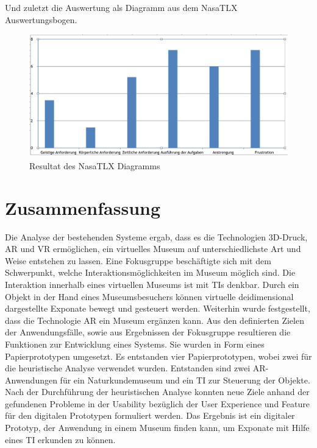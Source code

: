\documentclass[runningheads,a4paper, 12pt]{llncs}
\begin{document}
Und zuletzt die Auswertung als Diagramm aus dem NasaTLX Auswertungsbogen.
\begin{figure}[H]
	\centering
	\includegraphics[angle=0,scale=0.4]{nasatlx_diagram}
	\caption{Resultat des NasaTLX Diagramms}
	\label{fig:result3}
\end{figure}


\section{Zusammenfassung}
Die Analyse der bestehenden Systeme ergab, dass es die Technologien 3D-Druck, AR und VR ermöglichen, ein virtuelles Museum auf unterschiedlichste Art und Weise entstehen zu lassen. Eine Fokusgruppe beschäftigte sich mit dem Schwerpunkt, welche Interaktionsmöglichkeiten im Museum möglich sind. Die Interaktion innerhalb eines virtuellen Museums ist mit TIs denkbar. Durch ein Objekt in der Hand eines Museumsbesuchers können virtuelle deidimensional dargestellte Exponate bewegt und gesteuert werden. Weiterhin wurde festgestellt, dass die Technologie AR ein Museum ergänzen kann. Aus den definierten Zielen der Anwendungsfälle, sowie aus Ergebnissen der Fokusgruppe resultieren die Funktionen zur Entwicklung eines Systems. Sie wurden in Form eines Papierprototypen umgesetzt. Es entstanden vier Papierprototypen, wobei zwei für die heuristische Analyse verwendet wurden. Entstanden sind zwei AR-Anwendungen für ein Naturkundemuseum und ein TI zur Steuerung der Objekte. Nach der Durchführung der heuristischen Analyse konnten neue Ziele anhand der gefundenen  Probleme in der Usability bezüglich der User Experience und Feature für den digitalen Prototypen formuliert werden. Das Ergebnis ist ein digitaler Prototyp, der Anwendung in einem Museum finden kann, um Exponate mit Hilfe eines TI erkunden zu können.\\ 


\newpage
 

\end{document}
